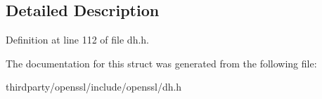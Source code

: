 \subsection{Detailed Description}


Definition at line 112 of file dh.\+h.



The documentation for this struct was generated from the following file\+:\begin{DoxyCompactItemize}
\item 
thirdparty/openssl/include/openssl/dh.\+h\end{DoxyCompactItemize}
